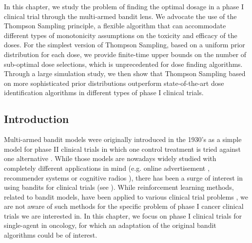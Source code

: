 %
%
%
%
In this chapter, we study the problem of finding the optimal dosage in a phase I clinical trial through the multi-armed bandit lens. We advocate the use of the Thompson Sampling principle, a flexible algorithm that can accommodate different types of monotonicity assumptions on the toxicity and efficacy of the doses. For the simplest version of Thompson Sampling, based on a uniform prior distribution for each dose, we provide finite-time upper bounds on the number of sub-optimal dose selections, which is unprecedented for dose finding algorithms. Through a large simulation study, we then show that Thompson Sampling based on more sophisticated prior distributions outperform state-of-the-art dose identification algorithms in different types of phase I clinical trials.  %


%

\subsection{Introduction}

Multi-armed bandit models were originally introduced in the 1930's as a simple model for phase II clinical trials in which one control treatment is tried against one alternative \cite{10.2307/2332286}. While those models are nowadays widely studied with completely different applications in mind (e.g. online advertisement \cite{LiChapelle11}, recommender systems \cite{LiCLS10News} or cognitive radios \cite{Anandkumar11}), there has been a surge of interest in using bandits for clinical trials (see \cite{Villar15BCT}). While reinforcement learning methods, related to bandit models, have been applied to various clinical trial problems \cite{Guez:2008:ATE:1620138.1620148, Zhao:2009:RLD:1751589, pmlr-v85-yauney18a}, we are not aware of such methods for the specific problem of phase I cancer clinical trials we are interested in.  In this chapter, we focus on phase I clinical trials for single-agent in oncology, for which an adaptation of the original bandit algorithms could be of interest.  

